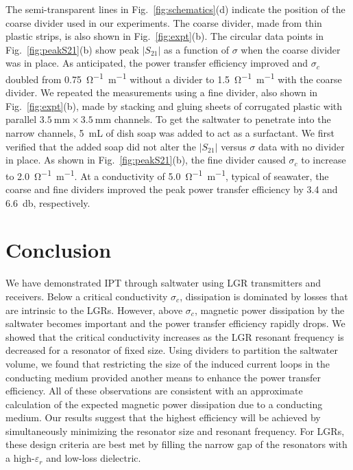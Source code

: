 \documentclass[conference]{IEEEtran}
\begin{document}
The semi-transparent lines in Fig.~\ref{fig:schematics}(d) indicate the position of the coarse divider used in our experiments.  The coarse divider, made from thin plastic strips, is also shown in Fig.~\ref{fig:expt}(b). The circular data points in Fig.~\ref{fig:peakS21}(b) show peak $\left\vert S_{21}\right\vert$ as a function of $\sigma$ when the coarse divider was in place.  As anticipated, the power transfer efficiency improved and $\sigma_c$ doubled from \SI{0.75}{\ohm\tothe{-1}\meter\tothe{-1}} without a divider to \SI{1.5}{\ohm\tothe{-1}\meter\tothe{-1}} with the coarse divider.  We repeated the measurements using a fine divider, also shown in Fig.~\ref{fig:expt}(b), made by stacking and gluing sheets of corrugated plastic with parallel $\SI{3.5}{\milli\meter}\times\SI{3.5}{\milli\meter}$ channels.  To get the saltwater to penetrate into the narrow channels, \SI{5}{\milli L} of dish soap was added to act as a surfactant.  We first verified that the added soap did not alter the $\left\vert S_{21}\right\vert$ versus $\sigma$ data with no divider in place.  As shown in Fig.~\ref{fig:peakS21}(b), the fine divider caused $\sigma_c$ to increase to \SI{2.0}{\ohm\tothe{-1}\meter\tothe{-1}}.  At a conductivity of \SI{5.0}{\ohm\tothe{-1}\meter\tothe{-1}}, typical of seawater, the coarse and fine dividers improved the peak power transfer efficiency by \num{3.4} and \SI{6.6}{\decibel}, respectively. 

\section{Conclusion}
We have demonstrated IPT through saltwater using LGR transmitters and receivers.  Below a critical conductivity $\sigma_c$, dissipation is dominated by losses that are intrinsic to the LGRs.  However, above $\sigma_c$, magnetic power dissipation by the saltwater becomes important and the power transfer efficiency rapidly drops.  We showed that the critical conductivity increases as the LGR resonant frequency is decreased for a resonator of fixed size.  Using dividers to partition the saltwater volume, we found that restricting the size of the induced current loops in the conducting medium provided another means to enhance the power transfer efficiency.  All of these observations are consistent with an approximate calculation of the expected magnetic power dissipation due to a conducting medium.  Our results suggest that the highest efficiency will be achieved by simultaneously minimizing the resonator size and resonant frequency.  For LGRs, these design criteria are best met by filling the narrow gap of the resonators with a high-$\varepsilon_r$ and low-loss dielectric.
\end{document}
